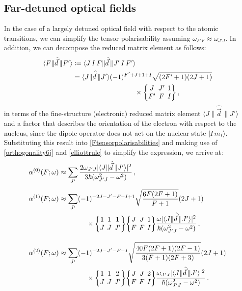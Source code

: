 \documentclass[../Thesis-IJspeert.tex]{subfiles}
\begin{document}
\subsection{Far-detuned optical fields}
In the case of a largely detuned optical field with respect to the atomic transitions, we can simplify the tensor polarisability assuming $\omega_{F'F}\approx\omega_{J'J}$. In addition, we can decompose the reduced matrix element as follows:
\begin{align}
\begin{split}
	 \langle F\| \hat{\vec{d}}\, \| F'\rangle &\coloneqq \langle J\, I\, F\| \hat{\vec{d}}\, \| J'\, I\, F'\rangle \\
	&=\langle J\| \hat{\vec{d}}\, \| J'\rangle(-1)^{F'+J+1+I} \sqrt{\left(2 F'+1\right)(2 J+1)} \\ &\hspace{9em}\times \tj{J}{J'}{1}{F'}{F}{I}\,,
\end{split}  
\end{align}
in terms of the fine-structure (electronic) reduced matrix element $\langle J\| \hat{\vec{d}}\, \| J'\rangle$ and a factor that describes the orientation of the electron with respect to the nucleus, since the dipole operator does not act on the nuclear state $\vert I\, m_I \rangle$. Substituting this result into \autoref{Ftensorpolarisabilities} and making use of \autoref{orthogonality6j} and \autoref{elliottrule} to simplify the expression, we arrive at:
\vspace{1em}
\begin{align}
	\begin{split}
	 \alpha^{(0)}(F ; \omega) &\approx \sum_{J'} \frac{2 \omega_{J' J}\lvert \langle J\| \hat{\vec{d}}\, \| J'\rangle\rvert ^2}{3 \hbar\left(\omega_{J' J}^2-\omega^2\right)}\,, \\[0.5em]
	 \alpha^{(1)}(F ; \omega) &\approx \sum_{J'}(-1)^{-2 J-J'-F-I+1} \sqrt{\frac{6 F(2 F+1)}{F+1}}(2 J+1) \\ 
	 &\hspace{4em}\times \tj{1}{1}{1}{J}{J}{J'} \tj{J}{J}{1}{F}{F}{I} \frac{\omega\lvert \langle J\| \hat{\vec{d}}\, \| J'\rangle\rvert ^2}{\hbar\left(\omega_{J' J}^2-\omega^2\right)}\,,\\[1em]
	 \alpha^{(2)}(F ; \omega) &\approx \sum_{J'}(-1)^{-2 J-J'-F-I} \sqrt{\frac{40 F(2 F+1)(2 F-1)}{3(F+1)(2 F+3)}}(2 J+1)  \\
	&\hspace{4em}\times \tj{1}{1}{2}{J}{J}{J'}\tj{J}{J}{2}{F}{F}{I} \frac{\omega_{J' J}\lvert \langle J\| \hat{\vec{d}}\, \| J' \rangle\rvert^2}{\hbar\left(\omega_{J' J}^2-\omega^2\right)}\,.
\end{split}
\label{polarisabilitiesfardetunedfields}
\end{align}
\end{document}
